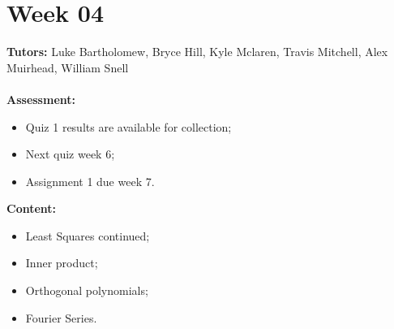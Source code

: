 \documentclass[11pt,a4paper]{report}
\begin{document}
	\begingroup
	\makeatletter
	\let\clearpage\relax
	\vspace*{\fill}%
	\vspace*{\dimexpr-50\p@-\baselineskip}
	\chapter*{Week 04}
	\textbf{Tutors:} Luke Bartholomew, Bryce Hill, Kyle Mclaren, Travis Mitchell, Alex Muirhead, William Snell \\\\
	\textbf{Assessment:} 
	\begin{itemize}
		\item Quiz 1 results are available for collection;
		\item Next quiz week 6;
		\item Assignment 1 due week 7.
	\end{itemize}	
	\textbf{Content:}
	\begin{itemize}
		\item Least Squares continued;
		\item Inner product;
		\item Orthogonal polynomials;
		\item Fourier Series.
	\end{itemize}
	\vspace*{\fill}
	\endgroup
	
	
\end{document}
